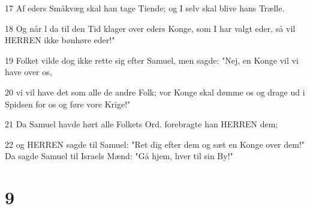 \par 17 Af eders Småkvæg skal han tage Tiende; og I selv skal blive hans Trælle.
\par 18 Og når l da til den Tid klager over eders Konge, som I har valgt eder, så vil HERREN ikke bønhøre eder!"
\par 19 Folket vilde dog ikke rette sig efter Samuel, men sagde: "Nej, en Konge vil vi have over os,
\par 20 vi vil have det som alle de andre Folk; vor Konge skal dømme os og drage ud i Spidsen for os og føre vore Krige!"
\par 21 Da Samuel havde hørt alle Folkets Ord. forebragte han HERREN dem;
\par 22 og HERREN sagde til Samuel: "Ret dig efter dem og sæt en Konge over dem!" Da sagde Samuel til Israels Mænd: "Gå hjem, hver til sin By!"

\chapter{9}

